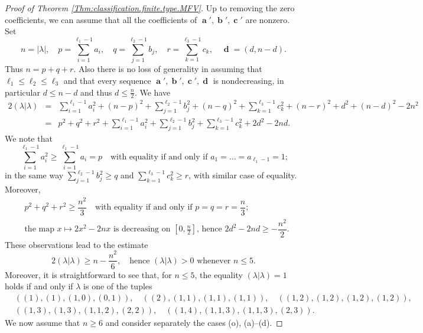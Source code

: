 \documentclass[12pt,reqno]{amsart}
\begin{document}
\begin{proof}[Proof  of Theorem \ref{Thm:classification.finite.type.MFV}]
Up to removing the zero coefficients, we can assume that all the coefficients of $\mbfa',\mbfb',\mbfc'$ are nonzero.
Set
$$
n=|\lambda|,\quad p=\sum_{i=1}^{\ell_1-1}a_i,\quad q=\sum_{j=1}^{\ell_2-1}b_j, \quad r=\sum_{k=1}^{\ell_3-1}c_k,\quad \mbfd=(d,n-d).
$$
Thus $n=p+q+r$.
Also there is no loss of generality in assuming that
$\ell_1\leq \ell_2\leq \ell_3$ and that
every sequence $\mbfa',\mbfb',\mbfc',\mbfd$ is nondecreasing,
in particular $d\leq n-d$ and
thus $d\leq\frac{n}{2}$.
We have
\begin{eqnarray}
2(\lambda|\lambda)
&=& \sum_{i=1}^{\ell_1-1}a_i^2+(n-p)^2+
\sum_{j=1}^{\ell_2-1}b_j^2+(n-q)^2+\sum_{k=1}^{\ell_3-1}c_k^2
+(n-r)^2+d^2+(n-d)^2-2n^2 \nonumber \\
&=& p^2+q^2+r^2+\sum_{i=1}^{\ell_1-1}a_i^2+
\sum_{j=1}^{\ell_2-1}b_j^2+\sum_{k=1}^{\ell_3-1}c_k^2+2d^2-2nd.
\label{3.4}
\end{eqnarray}
%
We note that
\begin{equation}
\sum_{i=1}^{\ell_1-1}a_i^2\geq \sum_{i=1}^{\ell_1-1}a_i=p \quad
\mbox{with equality if and only if $a_1=\ldots=a_{\ell_1-1}=1$;}
\label{3.5}
\end{equation}
in the same way $\sum_{j=1}^{\ell_2-1}b_j^2\geq q$ and $\sum_{k=1}^{\ell_3-1}c_k^2\geq r$,
with similar case of equality. Moreover,
\begin{eqnarray}
& p^2+q^2+r^2\geq\dfrac{n^2}{3}\quad \mbox{with equality if and only if $p=q=r=\dfrac{n}{3}$;}
\label{3.6}
\\
& \mbox{the map $x\mapsto 2x^2-2nx$ is decreasing on $[0,\frac{n}{2}]$,
hence $2d^2-2nd\geq -\dfrac{n^2}{2}$.}
\label{3.7}
\end{eqnarray}
These observations lead to the estimate
$$
2(\lambda|\lambda)\geq n-\frac{n^2}{6},\quad \mbox{hence $(\lambda|\lambda)>0$ whenever $n\leq 5$.}
$$
Moreover, it is straightforward to see that, for $n\leq 5$, the equality $(\lambda|\lambda)=1$ holds if and only if $\lambda$ is %
one of the tuples
\begin{eqnarray*}
 & ((1),(1),(1,0),(0,1)),\quad
((2),(1,1),(1,1),(1,1)),\quad
((1,2),(1,2),(1,2),(1,2)),\\
&
((1,3),(1,3),(1,1,2),(2,2)),\quad
((1,4),(1,1,3),(1,1,3),(2,3)).
\end{eqnarray*}
We now assume that $n\geq 6$ and consider separately the cases (o), (a)--(d).


\end{proof}
\end{document}
